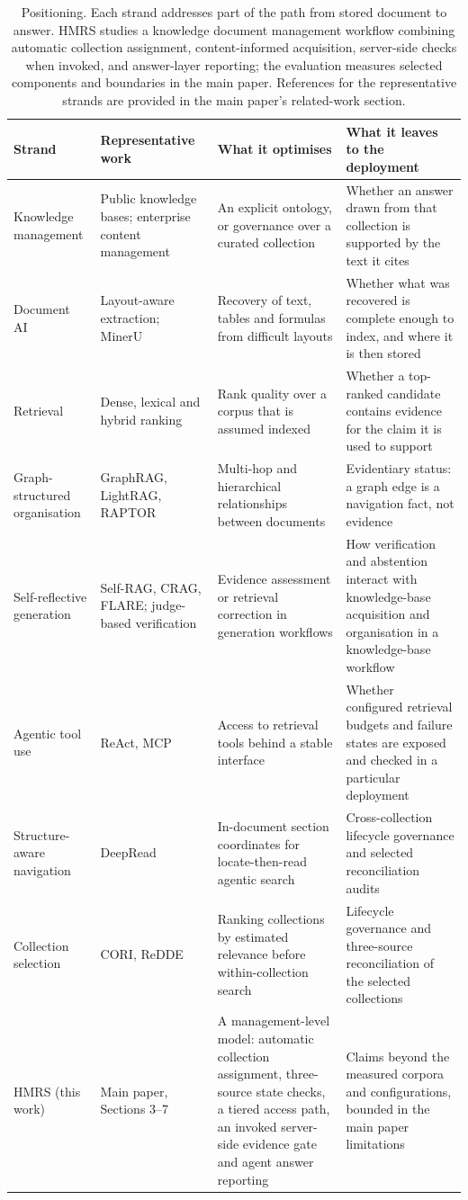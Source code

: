 \documentclass[11pt]{article}
\begin{document}
\begin{table}
\centering
\small
\setlength{\tabcolsep}{4pt}
\renewcommand{\arraystretch}{1.18}
\caption{Positioning. Each strand addresses part of the path from stored
document to answer. HMRS studies a knowledge document management workflow
combining automatic collection assignment, content-informed acquisition,
server-side checks when invoked, and answer-layer reporting; the evaluation
measures selected components and boundaries in the main paper. References for
the representative strands are provided in the main paper's related-work section.}

\begin{tabular}{@{}p{4cm}p{4cm}p{4cm}p{4cm}@{}}
\toprule
Strand & Representative work & What it optimises & What it leaves to the deployment\\
\midrule
Knowledge management & Public knowledge bases; enterprise content management & An explicit ontology, or governance over a curated collection & Whether an answer drawn from that collection is supported by the text it cites\\
Document AI & Layout-aware extraction; MinerU & Recovery of text, tables and formulas from difficult layouts & Whether what was recovered is complete enough to index, and where it is then stored\\
Retrieval & Dense, lexical and hybrid ranking & Rank quality over a corpus that is assumed indexed & Whether a top-ranked candidate contains evidence for the claim it is used to support\\
Graph-structured organisation & GraphRAG, LightRAG, RAPTOR & Multi-hop and hierarchical relationships between documents & Evidentiary status: a graph edge is a navigation fact, not evidence\\
Self-reflective generation & Self-RAG, CRAG, FLARE; judge-based verification & Evidence assessment or retrieval correction in generation workflows & How verification and abstention interact with knowledge-base acquisition and organisation in a knowledge-base workflow\\
Agentic tool use & ReAct, MCP & Access to retrieval tools behind a stable interface & Whether configured retrieval budgets and failure states are exposed and checked in a particular deployment\\
Structure-aware navigation & DeepRead  & In-document section coordinates for locate-then-read agentic search & Cross-collection lifecycle governance and selected reconciliation audits\\
Collection selection & CORI, ReDDE & Ranking collections by estimated relevance before within-collection search & Lifecycle governance and three-source reconciliation of the selected collections\\
\midrule
HMRS (this work) & Main paper, Sections 3--7 & A management-level model: automatic collection assignment, three-source state checks, a tiered access path, an invoked server-side evidence gate and agent answer reporting & Claims beyond the measured corpora and configurations, bounded in the main paper limitations\\
\bottomrule
\end{tabular}
\end{table}
\end{document}
